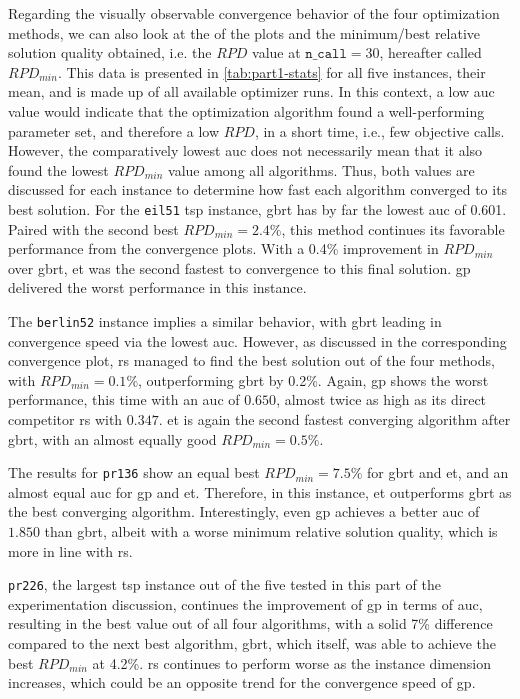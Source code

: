 Regarding the visually observable convergence behavior of the four optimization methods, we can also look at the  of the plots and the minimum/best relative solution quality obtained, i.e. the $RPD$ value at $\texttt{n\_call} = 30$, hereafter called $RPD_{min}$. This data is presented in \cref{tab:part1-stats} for all five instances, their mean, and is made up of all available optimizer runs.
In this context, a low \gls{auc} value would indicate that the optimization algorithm found a well-performing parameter set, and therefore a low $RPD$, in a short time, i.e., few objective calls. However, the comparatively lowest \gls{auc} does not necessarily mean that it also found the lowest $RPD_{min}$ value among all algorithms. Thus, both values are discussed for each instance to determine how fast each algorithm converged to its best solution. For the \texttt{eil51} \gls{tsp} instance, \gls{gbrt} has by far the lowest \gls{auc} of 0.601. Paired with the second best $RPD_{min} = 2.4\%$, this method continues its favorable performance from the convergence plots. With a 0.4\% improvement in $RPD_{min}$ over \gls{gbrt}, \gls{et} was the second fastest to convergence to this final solution. \gls{gp} delivered the worst performance in this instance.

The \texttt{berlin52} instance implies a similar behavior, with \gls{gbrt} leading in convergence speed via the lowest \gls{auc}. However, as discussed in the corresponding convergence plot, \gls{rs} managed to find the best solution out of the four methods, with $RPD_{min} = 0.1\%$, outperforming \gls{gbrt} by 0.2\%. Again, \gls{gp} shows the worst performance, this time with an \gls{auc} of $0.650$, almost twice as high as its direct competitor \gls{rs} with $0.347$. \gls{et} is again the second fastest converging algorithm after \gls{gbrt}, with an almost equally good $RPD_{min} = 0.5\%$.

The results for \texttt{pr136} show an equal best $RPD_{min} = 7.5\%$ for \gls{gbrt} and \gls{et}, and an almost equal \gls{auc} for \gls{gp} and \gls{et}. Therefore, in this instance, \gls{et} outperforms \gls{gbrt} as the best converging algorithm. Interestingly, even \gls{gp} achieves a better \gls{auc} of $1.850$ than \gls{gbrt}, albeit with a worse minimum relative solution quality, which is more in line with \gls{rs}.

\texttt{pr226}, the largest \gls{tsp} instance out of the five tested in this part of the experimentation discussion, continues the improvement of \gls{gp} in terms of \gls{auc}, resulting in the best value out of all four algorithms, with a solid 7\% difference compared to the next best algorithm, \gls{gbrt}, which itself, was able to achieve the best $RPD_{min}$ at 4.2\%. \gls{rs} continues to perform worse as the instance dimension increases, which could be an opposite trend for the convergence speed of \gls{gp}.

